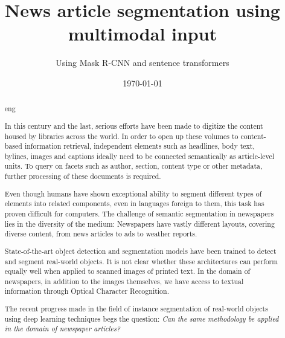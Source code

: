 \documentclass[oneside, english, bibtex]{kththesis}
\title{News article segmentation using multimodal input}
\subtitle{Using Mask R-CNN and sentence transformers}
\date{\today}
\begin{document}
%

\titlepage
\bookinfopage

\frontmatter
\setcounter{page}{1}
\begin{abstract}
  \markboth{\abstractname}{}
\begin{scontents}[store-env=lang]
eng
\end{scontents}
\begin{scontents}[store-env=abstracts,print-env=true]

In this century and the last, serious efforts have been made to digitize the content housed by libraries across the world. In order to open up these volumes to content-based information retrieval, independent elements such as headlines, body text, bylines, images and captions ideally need to be connected semantically as article-level units. To query on facets such as author, section, content type or other metadata, further processing of these documents is required.

Even though humans have shown exceptional ability to segment different types of elements into related components, even in languages foreign to them, this task has proven difficult for computers. The challenge of semantic segmentation in newspapers lies in the diversity of the medium: Newspapers have vastly different layouts, covering diverse content, from news articles to ads to weather reports.

State-of-the-art object detection and segmentation models have been trained to detect and segment real-world objects. It is not clear whether these architectures can perform equally well when applied to scanned images of printed text. In the domain of newspapers, in addition to the images themselves, we have access to textual information through Optical Character Recognition. 

The recent progress made in the field of instance segmentation of real-world objects using deep learning techniques begs the question: \textit{Can the same methodology be applied in the domain of newspaper articles?}


\end{scontents}
\end{abstract}
\end{document}
